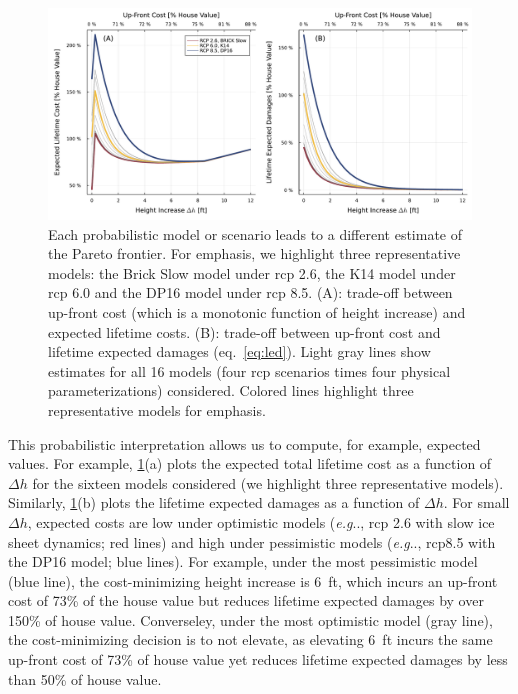 \documentclass[11pt]{article}
\makeatletter
\DeclareRobustCommand\onedot{\futurelet\@let@token\@onedot}
\def\@onedot{\ifx\@let@token.\else.\null\fi\xspace}
\def\eg{\emph{e.g}\onedot} \def\Eg{\emph{E.g}\onedot}
\DeclareRobustCommand\onedot{\futurelet\@let@token\@onedot}
\def\@onedot{\ifx\@let@token.\else.\null\fi\xspace}
\def\eg{\emph{e.g}\onedot} \def\Eg{\emph{E.g}\onedot}
\makeatother
\begin{document}
\begin{figure}
    \centering
    \includegraphics[width=\textwidth]{tradeoffs-by-rcp}
    \caption{
        Each probabilistic model or scenario leads to a different estimate of the Pareto frontier.
        For emphasis, we highlight three representative models: the Brick Slow model \citep{wong_brick0.2:2017} under \gls{rcp} 2.6, the K14 \citep{kopp_probabilistic:2014} model under \gls{rcp} 6.0 and the DP16 model \citep{deconto_antarctica:2016,kopp_evolving:2017} under \gls{rcp} 8.5.
        (A): trade-off between up-front cost (which is a monotonic function of height increase) and expected lifetime costs.
        (B): trade-off between up-front cost and lifetime expected damages (eq.~\ref{eq:led}).
        Light gray lines show estimates for all 16 models (four \gls{rcp} scenarios times four physical parameterizations) considered.
        Colored lines highlight three representative models for emphasis.
    }\label{fig:tradeoffs-by-rcp}
\end{figure}

This probabilistic interpretation allows us to compute, for example, expected values.
For example, \cref{fig:tradeoffs-by-rcp}(a) plots the expected total lifetime cost as a function of $\Delta h$ for the sixteen models considered (we highlight three representative models).
Similarly, \cref{fig:tradeoffs-by-rcp}(b) plots the lifetime expected damages as a function of $\Delta h$.
For small $\Delta h$, expected costs are low under optimistic models (\eg, \gls{rcp} 2.6 with slow ice sheet dynamics; red lines) and high under pessimistic models (\eg, \gls{rcp}8.5 with the DP16 model; blue lines).
For example, under the most pessimistic model (blue line), the cost-minimizing height increase is \SI{6}{ft}, which incurs an up-front cost of 73\% of the house value but reduces lifetime expected damages by over 150\% of house value.
Converseley, under the most optimistic model (gray line), the cost-minimizing decision is to not elevate, as elevating \SI{6}{ft} incurs the same up-front cost of 73\% of house value yet reduces lifetime expected damages by less than 50\% of house value.
\end{document}
